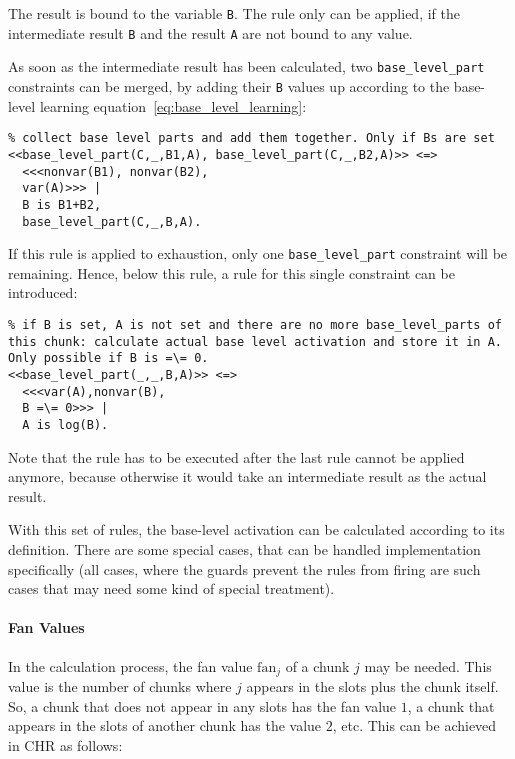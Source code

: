 The result is bound to the variable \lstinline|B|. The rule only can be applied, if the intermediate result \lstinline|B| and the result \lstinline|A| are not bound to any value.

As soon as the intermediate result has been calculated, two \lstinline|base_level_part| constraints can be merged, by adding their \lstinline|B| values up according to the base-level learning equation~\eqref{eq:base_level_learning}:

\begin{lstlisting}
% collect base level parts and add them together. Only if Bs are set
<<base_level_part(C,_,B1,A), base_level_part(C,_,B2,A)>> <=>
  <<<nonvar(B1), nonvar(B2), 
  var(A)>>> |
  B is B1+B2,
  base_level_part(C,_,B,A).
\end{lstlisting}

If this rule is applied to exhaustion, only one \lstinline|base_level_part| constraint will be remaining. Hence, below this rule, a rule for this single constraint can be introduced:

\begin{lstlisting}
% if B is set, A is not set and there are no more base_level_parts of this chunk: calculate actual base level activation and store it in A. Only possible if B is =\= 0.
<<base_level_part(_,_,B,A)>> <=>
  <<<var(A),nonvar(B), 
  B =\= 0>>> |
  A is log(B).
\end{lstlisting}

Note that the rule has to be executed after the last rule cannot be applied anymore, because otherwise it would take an intermediate result as the actual result.

With this set of rules, the base-level activation can be calculated according to its definition. There are some special cases, that can be handled implementation specifically (all cases, where the guards prevent the rules from firing are such cases that may need some kind of special treatment).

\paragraph{Fan Values}

In the calculation process, the fan value $\mathrm{fan}_j$ of a chunk $j$ may be needed. This value is the number of chunks where $j$ appears in the slots plus the chunk itself. So, a chunk that does not appear in any slots has the fan value $1$, a chunk that appears in the slots of another chunk has the value $2$, etc. This can be achieved in CHR as follows:

